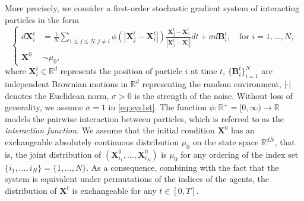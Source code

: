\documentclass[]{elsarticle}
\def\R{\mathbb{R}}
\newcommand{\mbf}[1]{\boldsymbol{#1}}
\newcommand{\realR}[1]{\mathbb{R}^{#1}}
\newcommand{\bB}{\mbf{B}}
\newcommand{\bX}{\mbf{X}}
\numberwithin{equation}{section}
\numberwithin{theorem}{section}
\begin{document}
More precisely, we consider a first-order stochastic gradient system of interacting particles in the form
\begin{equation}\label{eq:sys1st}
\left\{
\begin{aligned}
  d{\bX_i^t}& =\frac{1}{N} \sum_{1\leq j\leq N, j\neq i} \phi(|\bX_{j}^t - \bX_i^t|) \frac{\bX_{j}^t - \bX_i^t}{|\bX_{j}^t - \bX_i^t|}dt+ \sigma d\bB_i^t, \quad \text{for $i = 1, \ldots, N$},\\
  \bX^0&\sim \mu_0,
\end{aligned}
\right.
\end{equation}
where $\bX_i^t \in \realR{d}$ represents the position of particle $i$ at time $t$, $\{\bB_i^t\}_{i=1}^N$ are independent Brownian motions in $\realR{d}$ representing the random environment, $|\cdot|$ denotes the Euclidean norm, $\sigma>0$ is the strength of the noise. Without loss of generality, we assume $\sigma=1$ in \eqref{eq:sys1st}. 
The function $\phi:\R^+=[0,\infty)\to \R$ models the pairwise interaction between particles, which is referred to as the \emph{interaction function}.  
We assume that the initial condition $\bX^0$ has an exchangeable absolutely continuous distribution $ \mu_0$ on the state space $\R^{dN}$, that is, the joint distribution of $(\bX^0_{i_1},\ldots,\bX^0_{i_N})$ is $\mu_0$ for any ordering of the index set $\{i_1,\ldots,i_N\}= \{1,\ldots, N\}$. As a consequence, combining with the fact that the system is equivalent under permutations of the indices of the agents,
the distribution of $\bX^t$ is exchangeable for any $t\in [0,T]$.   
\end{document}
